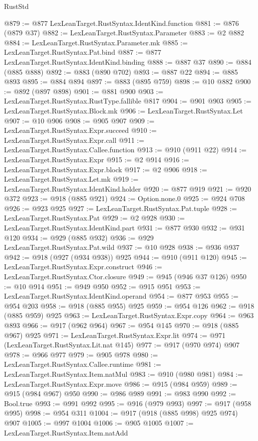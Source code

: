 \begin{lexlean}{RustStd}
\begin{coremodule}
@879 := @877 LexLeanTarget.RustSyntax.IdentKind.function
@881 := @876 (@879 @37)
@882 := LexLeanTarget.RustSyntax.Parameter
@883 := @2 @882
@884 := LexLeanTarget.RustSyntax.Parameter.mk
@885 := LexLeanTarget.RustSyntax.Pat.bind
@887 := @877 LexLeanTarget.RustSyntax.IdentKind.binding
@888 := @887 @37
@890 := @884 (@885 @888)
@892 := @883 (@890 @702)
@893 := @887 @22
@894 := @885 @893
@895 := @884 @894
@897 := @883 (@895 @759)
@898 := @10 @882
@900 := @892 (@897 @898)
@901 := @881 @900
@903 := LexLeanTarget.RustSyntax.RustType.fallible @817
@904 := @901 @903
@905 := LexLeanTarget.RustSyntax.Block.mk
@906 := LexLeanTarget.RustSyntax.Let
@907 := @10 @906
@908 := @905 @907
@909 := LexLeanTarget.RustSyntax.Expr.succeed
@910 := LexLeanTarget.RustSyntax.Expr.call
@911 := LexLeanTarget.RustSyntax.Callee.function
@913 := @910 (@911 @22)
@914 := LexLeanTarget.RustSyntax.Expr
@915 := @2 @914
@916 := LexLeanTarget.RustSyntax.Expr.block
@917 := @2 @906
@918 := LexLeanTarget.RustSyntax.Let.mk
@919 := LexLeanTarget.RustSyntax.IdentKind.holder
@920 := @877 @919
@921 := @920 @372
@923 := @918 (@885 @921)
@924 := Option.none.{0}
@925 := @924 @708
@926 := @923 @925
@927 := LexLeanTarget.RustSyntax.Pat.tuple
@928 := LexLeanTarget.RustSyntax.Pat
@929 := @2 @928
@930 := LexLeanTarget.RustSyntax.IdentKind.part
@931 := @877 @930
@932 := @931 @120
@934 := @929 (@885 @932)
@936 := @929 LexLeanTarget.RustSyntax.Pat.wild
@937 := @10 @928
@938 := @936 @937
@942 := @918 (@927 (@934 @938)) @925
@944 := @910 (@911 @120)
@945 := LexLeanTarget.RustSyntax.Expr.construct
@946 := LexLeanTarget.RustSyntax.Ctor.closure
@949 := @945 (@946 @37 @126)
@950 := @10 @914
@951 := @949 @950
@952 := @915 @951
@953 := LexLeanTarget.RustSyntax.IdentKind.operand
@954 := @877 @953
@955 := @954 @203
@958 := @918 (@885 @955) @925
@959 := @954 @126
@962 := @918 (@885 @959) @925
@963 := LexLeanTarget.RustSyntax.Expr.copy
@964 := @963 @893
@966 := @917 (@962 @964)
@967 := @954 @145
@970 := @918 (@885 @967) @925
@971 := LexLeanTarget.RustSyntax.Expr.lit
@974 := @971 (LexLeanTarget.RustSyntax.Lit.nat @145)
@977 := @917 (@970 @974) @907
@978 := @966 @977
@979 := @905 @978
@980 := LexLeanTarget.RustSyntax.Callee.runtime
@981 := LexLeanTarget.RustSyntax.Item.natMul
@983 := @910 (@980 @981)
@984 := LexLeanTarget.RustSyntax.Expr.move
@986 := @915 (@984 @959)
@989 := @915 (@984 @967) @950
@990 := @986 @989
@991 := @983 @990
@992 := Bool.true
@993 := @991 @992
@995 := @916 (@979 @993)
@997 := @917 (@958 @995)
@998 := @954 @311
@1004 := @917 (@918 (@885 @998) @925 @974) @907
@1005 := @997 @1004
@1006 := @905 @1005
@1007 := LexLeanTarget.RustSyntax.Item.natAdd

\end{coremodule}
\end{lexlean}
